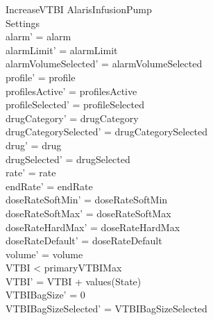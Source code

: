 \begin{schema}{IncreaseVTBI}
\pagebreak
	\Delta AlarisInfusionPump\\
	Settings\\
	\where
	alarm' = alarm\\
	alarmLimit' = alarmLimit\\
	alarmVolumeSelected' = alarmVolumeSelected\\
	profile' = profile\\
	profilesActive' = profilesActive\\    
	profileSelected' = profileSelected\\
	drugCategory' = drugCategory\\ drugCategorySelected' = drugCategorySelected\\
	drug' = drug\\ drugSelected' = drugSelected\\
	rate' = rate\\
	endRate' = endRate\\
	doseRateSoftMin' = doseRateSoftMin\\
	doseRateSoftMax' = doseRateSoftMax\\
	doseRateHardMax' = doseRateHardMax\\
	doseRateDefault' = doseRateDefault\\
	volume' = volume\\
	VTBI < primaryVTBIMax\\
	VTBI' = VTBI + values(State)\\
	VTBIBagSize' = 0\\ VTBIBagSizeSelected' = VTBIBagSizeSelected\\

\end{schema}
